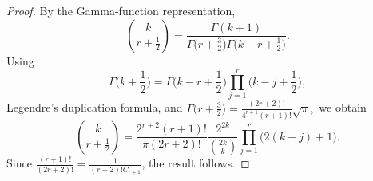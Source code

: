 \documentclass[10pt,a4paper]{amsart}
\begin{document}
\begin{proof}
	By the Gamma-function representation,
	$$
	\binom{k}{r+\frac12}
	=\frac{\Gamma(k+1)}
	{\Gamma\big(r+\frac32\big)
		\Gamma\big(k-r+\frac12\big)}.
	$$
	Using
\[
	\Gamma\Big(k+\frac12\Big)
=\Gamma\Big(k-r+\frac12\Big)
	\prod_{j=1}^r\Big(k-j+\frac12\Big),
\]
	Legendre's duplication formula, and
	$
	\Gamma\big(r+\frac32\big)
	=
	\frac{(2r+2)!}{4^{r+1}(r+1)!}\sqrt{\pi},
	$
	we obtain
	\[
	\binom{k}{r+\frac12}
	=
	\frac{2^{r+2}(r+1)!}{\pi(2r+2)!}
	\frac{2^{2k}}{\binom{2k}{k}}
	\prod_{j=1}^r\bigl(2(k-j)+1\bigr).
	\]
	Since
$\frac{(r+1)!}{(2r+2)!}
	=	\frac{1}{(r+2)!C_{r+1}}$,
	the result follows.
\end{proof}
\end{document}

